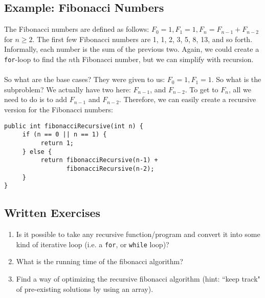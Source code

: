 \subsection{Example: Fibonacci Numbers}
The Fibonacci numbers are defined as follows: $F_0 = 1, F_1 = 1, F_n = F_{n-1} + F_{n-2}$ for $n \ge 2$. The first few Fibonacci numbers are 1, 1, 2, 3, 5, 8, 13, and so forth. Informally, each number is the sum of the previous two. Again, we could create a \verb|for|-loop to find the $n$th Fibonacci number, but we can simplify with recursion.
\\ \\
So what are the base cases? They were given to us: $F_0 = 1, F_1 = 1$. So what is the subproblem? We actually have two here: $F_{n-1}$, and $F_{n-2}$. To get to $F_n$, all we need to do is to add $F_{n-1}$ and $F_{n-2}$. Therefore, we can easily create a recursive version for the Fibonacci numbers:
\begin{lstlisting}
public int fibonacciRecursive(int n) {
     if (n == 0 || n == 1) {
          return 1;
     } else {
          return fibonacciRecursive(n-1) + 
                 fibonacciRecursive(n-2);
     }
}
\end{lstlisting}

\subsection{Written Exercises}
\setcounter{counter}{1}
\begin{enumerate}[label={\arabic{counter}\addtocounter{counter}{1}}.]
\item Is it possible to take any recursive function/program and convert it into some kind of iterative loop (i.e. a \verb|for|, or \verb|while| loop)?
\item What is the running time of the fibonacci algorithm?
\item Find a way of optimizing the recursive fibonacci algorithm (hint: ``keep track" of pre-existing solutions by using an array).
\end{enumerate}